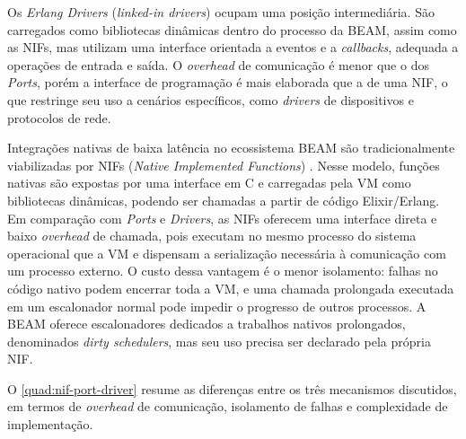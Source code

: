 Os \textit{Erlang Drivers} (\textit{linked-in drivers}) ocupam uma posição intermediária. São carregados como bibliotecas dinâmicas dentro do processo da \gls{BEAM}, assim como as \glspl{NIF}, mas utilizam uma interface orientada a eventos e a \textit{callbacks}, adequada a operações de entrada e saída. O \textit{overhead} de comunicação é menor que o dos \textit{Ports}, porém a interface de programação é mais elaborada que a de uma \gls{NIF}, o que restringe seu uso a cenários específicos, como \textit{drivers} de dispositivos e protocolos de rede.

Integrações nativas de baixa latência no ecossistema \gls{BEAM} são tradicionalmente viabilizadas por \glspl{NIF} (\textit{Native Implemented Functions}) \citep{erlnif2024}. Nesse modelo, funções nativas são expostas por uma interface em C e carregadas pela \gls{VM} como bibliotecas dinâmicas, podendo ser chamadas a partir de código Elixir/Erlang. Em comparação com \textit{Ports} e \textit{Drivers}, as \glspl{NIF} oferecem uma interface direta e baixo \textit{overhead} de chamada, pois executam no mesmo processo do sistema operacional que a \gls{VM} e dispensam a serialização necessária à comunicação com um processo externo. O custo dessa vantagem é o menor isolamento: falhas no código nativo podem encerrar toda a \gls{VM}, e uma chamada prolongada executada em um escalonador normal pode impedir o progresso de outros processos. A \gls{BEAM} oferece escalonadores dedicados a trabalhos nativos prolongados, denominados \textit{dirty schedulers}, mas seu uso precisa ser declarado pela própria \gls{NIF}.

O \autoref{quad:nif-port-driver} resume as diferenças entre os três mecanismos discutidos, em termos de \textit{overhead} de comunicação, isolamento de falhas e complexidade de implementação.

